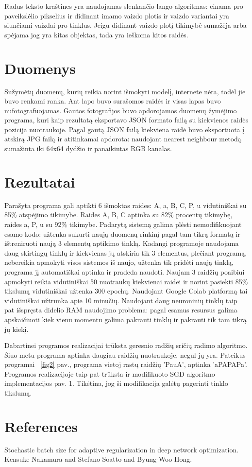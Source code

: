 \documentclass[conference]{IEEEtran}
\begin{document}
\par
Radus teksto kraštines yra naudojamas slenkančio lango algoritmas: einama
pro paveikslėlio pikselius ir didinant imamo vaizdo plotis ir vaizdo variantai yra
 siunčiami vaizdai pro
tinklus. Jeigu didinant vaizdo plotį tikimybė sumažėja arba spėjama jog yra kitas
objektas, tada yra ieškoma kitos raidės.

\section{Duomenys}

Sužymėtų duomenų, kurių reikia norint išmokyti modelį, internete nėra, todėl
jie buvo renkami ranka. Ant lapo buvo surašomos raidės ir visas lapas buvo
nufotografuojamas. Gautos fotografijos buvo apdorojamos duomenų žymėjimo programa,
kuri kaip rezultatą eksportavo JSON formato failą su kiekvienos raidės pozicija
nuotraukoje. Pagal gautą JSON failą kiekviena raidė buvo eksportuota į atskirą JPG
failą ir atitinkamai apdorota: naudojant nearest neighbour metodą sumažinta iki
64x64 dydžio ir panaikintas RGB kanalas.

\section{Rezultatai}

Parašyta programa gali aptikti 6 išmoktas raides: A, a, B, C, P, u vidutiniškai su
85\% atspėjimo tikimybe. Raides A, B, C aptinka su 82\% procentų tikimybę, raides a, P, u
su 92\% tikimybe. Padarytą sistemą galima plėsti nemodifikuojant esamo kodo:
užtenka sukurti naują duomenų rinkinį pagal tam tikrą formatą ir ištreniruoti naują
3 elementų aptikimo tinklą. Kadangi programoje naudojama daug skirtingų tinklų ir kiekvienas
jų atskiria tik 3 elementus, plečiant programą, nebereikia apmokyti visos sistemos iš naujo,
užtenka tik pridėti naują tinklą, programa jį automatiškai aptinka ir pradeda naudoti.
Naujam 3 raidžių poaibiui apmokyti reikia vidutiniškai 50 nuotraukų kiekvienai raidei ir
norint pasiekti 85\% tikslumą vidutiniškai užtenka 300 epochų. Naudojant Google Colab
platformą tai vidutiniškai užtrunka apie 10 minučių. Naudojant daug neuroninių tinklų
taip pat išspręsta didelio RAM naudojimo problema: pagal esamus resursus galima
apskaičiuoti kiek vienu momentu galima pakrauti tinklų ir pakrauti tik tam tikrą jų
kiekį.
\par
Dabartinei programos realizacijai trūksta geresnio radžių sričių radimo algoritmo.
Šiuo metu programa aptinka daugiau raidžių nuotraukoje, negul jų yra. Pateikus
programai ~\ref{fig2} pav., programa vietoj rastų raidžių 'PauA', aptinka 'aPAPAPa'.
Programos realizacijoje taip pat trūksta ir modifikuoto SGD algoritmo implementacijos pav. 1. Tikėtina, jog ši modifikacija galėtų pagerinti
tinklo tikslumą.

\printbibliography

\section{References}
\par
[1] Stochastic batch size for adaptive regularization in deep network optimization. Kensuke Nakamura and Stefano Soatto and Byung-Woo Hong. 
\end{document}
